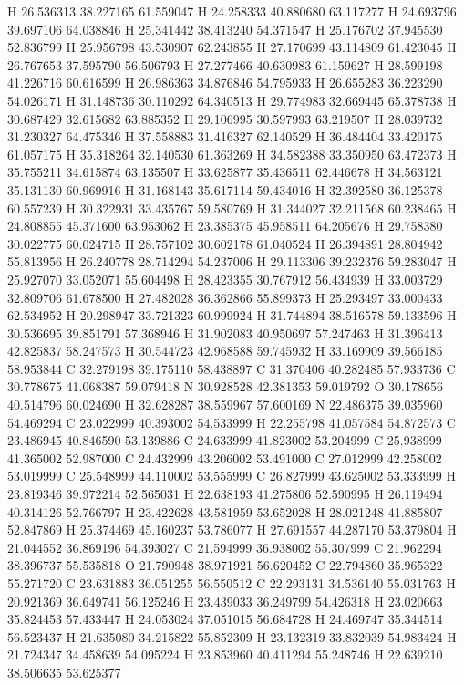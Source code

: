 \documentclass{article}
\begin{document}
H 26.536313 38.227165 61.559047
H 24.258333 40.880680 63.117277
H 24.693796 39.697106 64.038846
H 25.341442 38.413240 54.371547
H 25.176702 37.945530 52.836799
H 25.956798 43.530907 62.243855
H 27.170699 43.114809 61.423045
H 26.767653 37.595790 56.506793
H 27.277466 40.630983 61.159627
H 28.599198 41.226716 60.616599
H 26.986363 34.876846 54.795933
H 26.655283 36.223290 54.026171
H 31.148736 30.110292 64.340513
H 29.774983 32.669445 65.378738
H 30.687429 32.615682 63.885352
H 29.106995 30.597993 63.219507
H 28.039732 31.230327 64.475346
H 37.558883 31.416327 62.140529
H 36.484404 33.420175 61.057175
H 35.318264 32.140530 61.363269
H 34.582388 33.350950 63.472373
H 35.755211 34.615874 63.135507
H 33.625877 35.436511 62.446678
H 34.563121 35.131130 60.969916
H 31.168143 35.617114 59.434016
H 32.392580 36.125378 60.557239
H 30.322931 33.435767 59.580769
H 31.344027 32.211568 60.238465
H 24.808855 45.371600 63.953062
H 23.385375 45.958511 64.205676
H 29.758380 30.022775 60.024715
H 28.757102 30.602178 61.040524
H 26.394891 28.804942 55.813956
H 26.240778 28.714294 54.237006
H 29.113306 39.232376 59.283047
H 25.927070 33.052071 55.604498
H 28.423355 30.767912 56.434939
H 33.003729 32.809706 61.678500
H 27.482028 36.362866 55.899373
H 25.293497 33.000433 62.534952
H 20.298947 33.721323 60.999924
H 31.744894 38.516578 59.133596
H 30.536695 39.851791 57.368946
H 31.902083 40.950697 57.247463
H 31.396413 42.825837 58.247573
H 30.544723 42.968588 59.745932
H 33.169909 39.566185 58.953844
C 32.279198 39.175110 58.438897
C 31.370406 40.282485 57.933736
C 30.778675 41.068387 59.079418
N 30.928528 42.381353 59.019792
O 30.178656 40.514796 60.024690
H 32.628287 38.559967 57.600169
N 22.486375 39.035960 54.469294
C 23.022999 40.393002 54.533999
H 22.255798 41.057584 54.872573
C 23.486945 40.846590 53.139886
C 24.633999 41.823002 53.204999
C 25.938999 41.365002 52.987000
C 24.432999 43.206002 53.491000
C 27.012999 42.258002 53.019999
C 25.548999 44.110002 53.555999
C 26.827999 43.625002 53.333999
H 23.819346 39.972214 52.565031
H 22.638193 41.275806 52.590995
H 26.119494 40.314126 52.766797
H 23.422628 43.581959 53.652028
H 28.021248 41.885807 52.847869
H 25.374469 45.160237 53.786077
H 27.691557 44.287170 53.379804
H 21.044552 36.869196 54.393027
C 21.594999 36.938002 55.307999
C 21.962294 38.396737 55.535818
O 21.790948 38.971921 56.620452
C 22.794860 35.965322 55.271720
C 23.631883 36.051255 56.550512
C 22.293131 34.536140 55.031763
H 20.921369 36.649741 56.125246
H 23.439033 36.249799 54.426318
H 23.020663 35.824453 57.433447
H 24.053024 37.051015 56.684728
H 24.469747 35.344514 56.523437
H 21.635080 34.215822 55.852309
H 23.132319 33.832039 54.983424
H 21.724347 34.458639 54.095224
H 23.853960 40.411294 55.248746
H 22.639210 38.506635 53.625377
~    
   
\end{document}
